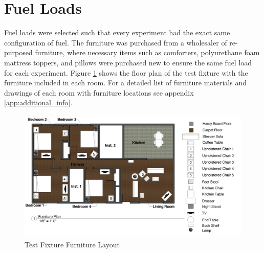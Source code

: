 \documentclass[12pt,oneside]{book}
\begin{document}
\section{Fuel Loads}
Fuel loads were selected such that every experiment had the exact same configuration of fuel. The furniture was purchased from a wholesaler of re-purposed furniture, where necessary items such as comforters, polyurethane foam mattress toppers, and pillows were purchased new to ensure the same fuel load for each experiment. Figure \ref{fig:furniture_layout} shows the floor plan of the test fixture with the furniture included in each room. For a detailed list of furniture materials and drawings of each room with furniture locations see appendix \ref{app:additional_info}.


\begin{figure}[H]{}
\centering
\includegraphics[height = 2.5in]{0_Images/Instrumentation/Furniture_Plan.png}
\caption{Test Fixture Furniture Layout}
\label{fig:furniture_layout}
\end{figure}
\end{document}
